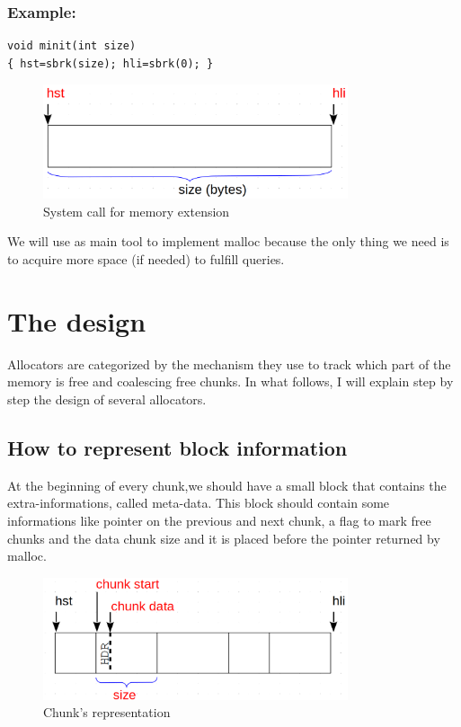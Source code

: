 \subsubsection{Example:}

\begin{lstlisting}
void minit(int size) 
{ hst=sbrk(size); hli=sbrk(0); }
\end{lstlisting}

\begin{figure}[htbp]
    \begin{center}
        \includegraphics[width=0.8\textwidth]{figures/sbrk}
    \caption{System call for memory extension}
    \label{}
    \end{center}
\end{figure}

We will use  as main tool to implement malloc because the only thing we need is to acquire more space (if needed) to fulfill queries.

\section{The design}
 Allocators are categorized by the mechanism they use to track which part of the memory is free and coalescing free chunks.
In what follows, I will explain step by step the design of several allocators.

\subsection{How to represent block information}
At the beginning of every chunk,we should have a small block that contains the extra-informations, called meta-data. This block should contain some informations like pointer on the previous and next chunk, a flag to mark free chunks and the data chunk size and it is placed before the pointer returned by malloc.

\begin{figure}[htbp]
    \begin{center}
        \includegraphics[width=0.8\textwidth]{figures/chunk}
    \caption{Chunk's representation }
    \label{chunkrep}
    \end{center}
\end{figure}

